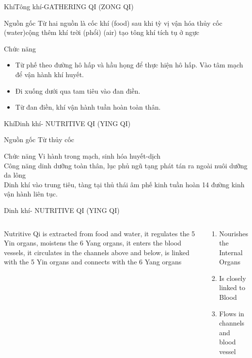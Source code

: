\documentclass[
	11pt, %
]{beamer}
\theoremstyle{newblock}
\begin{document}
\begin{frame}{Khí}{Tông khí-GATHERING QI (ZONG QI)}
	\begin{block}{Nguồn gốc}
		Từ hai nguồn là cốc khí (food) sau khi tỳ vị vận hóa thủy cốc (water)cộng thêm khí trời (phổi) (air) tạo tông khí tích tụ ở ngực
	\end{block}
	\begin{block}{Chức năng}
		\begin{itemize}
			\item Từ phế theo đường hô hấp và hầu họng để thực hiện hô hấp. Vào tâm mạch để vận hành khí huyết.
			\item Đi xuống dưới qua tam tiêu vào đan điền.
			\item Từ đan điền, khí vận hành tuần hoàn toàn thân.
		\end{itemize}

	\end{block}
\end{frame}
\begin{frame}{Khí}{Dinh khí- NUTRITIVE QI (YING QI)}
	\begin{block}{Nguồn gốc}
		Từ thủy cốc 
	\end{block}
	\begin{block}{Chức năng}
		Vi hành trong mạch, sinh hóa huyết-dịch\\
		Công năng dinh dưỡng toàn thân, lục phủ ngũ tạng phát tán ra ngoài nuôi dưỡng da lông\\
		Dinh khí vào trung tiêu, tàng tại thủ thái âm phế kinh tuần hoàn 14 đường kinh vận hành liên tục.
	\end{block}
\end{frame}
\begin{frame}{Dinh khí- NUTRITIVE QI (YING QI)}
	\begin{columns}
		\begin{block}{}
			Nutritive Qi is extracted from food and water, it regulates the 5 Yin organs, moistens the 6 Yang organs, it enters the blood vessels, it circulates in the channels above and below, is linked with the 5 Yin organs and connects with the 6 Yang organs
		\end{block}
		\begin{block}{}
			\begin{enumerate}
				\item Nourishes the Internal Organs
				\item Is closely linked to Blood
				\item Flows in channels and blood vessel
			\end{enumerate}
		\end{block}
	\end{columns}
\end{frame}
\end{document}

